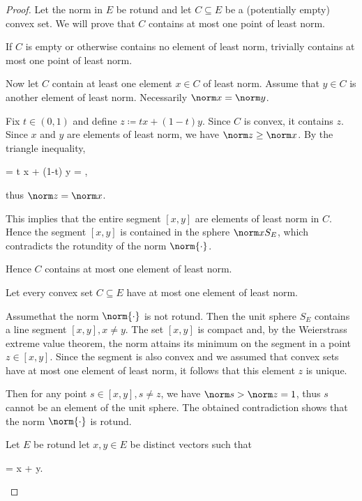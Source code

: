 \begin{proof}
   Let the norm in \( E \) be rotund and let \( C \subseteq E \) be a (potentially empty) convex set. We will prove that \( C \) contains at most one point of least norm.

  If \( C \) is empty or otherwise contains no element of least norm, trivially contains at most one point of least norm.

  Now let \( C \) contain at least one element \( x \in C \) of least norm. Assume that \( y \in C \) is another element of least norm. Necessarily \( \norm x = \norm y \).

  Fix \( t \in (0, 1) \) and define \( z \coloneqq tx + (1-t)y \). Since \( C \) is convex, it contains \( z \). Since \( x \) and \( y \) are elements of least norm, we have \( \norm z \geq \norm x \). By the triangle inequality,
  \begin{balign*}
    =
    \leq
    t \norm x + (1-t) \norm y
    =
    ,
  \end{balign*}
  thus \( \norm z = \norm x \).

  This implies that the entire segment \( [x, y] \) are elements of least norm in \( C \). Hence the segment \( [x, y] \) is contained in the sphere \( \norm x S_E \), which contradicts the rotundity of the norm \( \norm{\cdot} \).

  Hence \( C \) contains at most one element of least norm.

   Let every convex set \( C \subseteq E \) have at most one element of least norm.

  Assume\LEM that the norm \( \norm{\cdot} \) is not rotund. Then the unit sphere \( S_E \) contains a line segment \( [x, y], x \neq y \). The set \( [x, y] \) is compact and, by the Weierstrass extreme value theorem, the norm attains its minimum on the segment in a point \( z \in [x, y] \). Since the segment is also convex and we assumed that convex sets have at most one element of least norm, it follows that this element \( z \) is unique.

  Then for any point \( s \in [x, y], s \neq z \), we have \( \norm s > \norm z = 1 \), thus \( s \) cannot be an element of the unit sphere. The obtained contradiction shows that the norm \( \norm{\cdot} \) is rotund.

   Let \( E \) be rotund let \( x, y \in E \) be distinct vectors such that
  \begin{balign}\label{def:rotund_norm/linearly_dependent/assumption}
     = \norm x + \norm y.
  \end{balign}


\end{proof}
